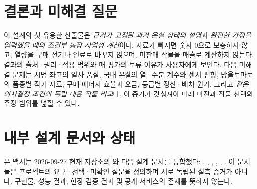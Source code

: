 \documentclass[11pt,a4paper]{article}
\begin{document}
\section{결론과 미해결 질문}
이 설계의 첫 유용한 산출물은 \emph{근거가 고정된 과거 온실 상태의 설명}과 \emph{완전한 가정을 입력했을 때의 조건부 농장 사업성 계산}이다. 자료가 빠지면 숫자 0으로 보충하지 않고, 열량을 구매 전기나 연료로 바꾸지 않으며, 미판매 작물을 매출로 계산하지 않는다. 결과의 출처·권리·적용 범위와 매 평가의 보류 이유가 사용자에게 보인다. 다음 미해결 문제는 시범 좌표의 일사 품질, 국내 온실의 열·수분 계수와 센서 편향, 방울토마토의 품종별 작기 자료, 구매 에너지 효율과 요금, 등급별 정산·배치 원가, 그리고 \emph{같은 의사결정 조건의 독립 대응 작물 비교}다. 이 증거가 갖춰져야 미래 마진과 작물 선택의 주장 범위를 넓힐 수 있다.

\section*{내부 설계 문서와 상태}
{}
본 백서는 2026-09-27 현재 저장소의 와 다음 설계 문서를 통합했다: , , , , , . 이 문서들은 프로젝트의 요구·선택·미확인 질문을 정의하며 서로 독립된 실측 증거가 아니다. 구현물, 성능 결과, 현장 검증 결과 및 공개 서비스의 존재를 뜻하지 않는다.
\end{document}
